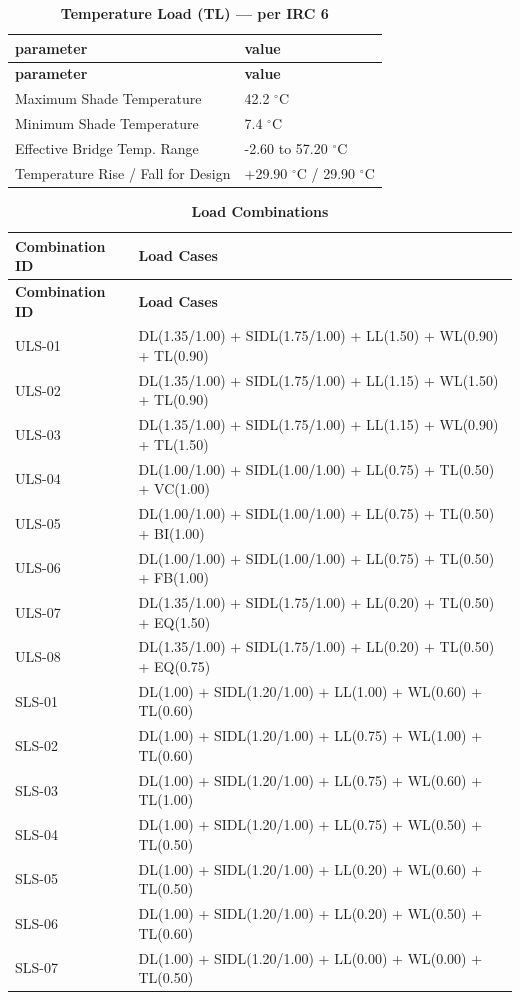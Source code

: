 \documentclass[12pt,a4paper]{report}
\numberwithin{table}{chapter}
\numberwithin{figure}{chapter}
\begin{document}
\vspace{1em}
\begin{longtable}{|L{5.5cm}|p{10.0cm}|}
\caption{\textbf{Temperature Load (TL) --- per IRC 6}}
\hline
\textbf{parameter} & \textbf{value} \\
\hline
\endfirsthead
\hline
\textbf{parameter} & \textbf{value} \\
\hline
\endhead
\textnormal{Maximum Shade Temperature} & 42.2 $^\circ$C \\[6pt]
\hline
\textnormal{Minimum Shade Temperature} & 7.4 $^\circ$C \\[6pt]
\hline
\textnormal{Effective Bridge Temp. Range} & -2.60 to 57.20 $^\circ$C \\[6pt]
\hline
\textnormal{Temperature Rise / Fall for Design} & +29.90 $^\circ$C / \textminus{}29.90 $^\circ$C \\[6pt]
\hline
\end{longtable}
\newpage
\vspace{1em}
\begin{longtable}{|C{4.0cm}|p{11.5cm}|}
\caption{\textbf{Load Combinations}}
\hline
\textbf{Combination ID} & \textbf{Load Cases} \\[6pt]
\hline
\endfirsthead
\hline
\textbf{Combination ID} & \textbf{Load Cases} \\[6pt]
\hline
\endhead
ULS-01 & DL(1.35/1.00) + SIDL(1.75/1.00) + LL(1.50) + WL(0.90) + TL(0.90) \\[6pt]
\hline
ULS-02 & DL(1.35/1.00) + SIDL(1.75/1.00) + LL(1.15) + WL(1.50) + TL(0.90) \\[6pt]
\hline
ULS-03 & DL(1.35/1.00) + SIDL(1.75/1.00) + LL(1.15) + WL(0.90) + TL(1.50) \\[6pt]
\hline
ULS-04 & DL(1.00/1.00) + SIDL(1.00/1.00) + LL(0.75) + TL(0.50) + VC(1.00) \\[6pt]
\hline
ULS-05 & DL(1.00/1.00) + SIDL(1.00/1.00) + LL(0.75) + TL(0.50) + BI(1.00) \\[6pt]
\hline
ULS-06 & DL(1.00/1.00) + SIDL(1.00/1.00) + LL(0.75) + TL(0.50) + FB(1.00) \\[6pt]
\hline
ULS-07 & DL(1.35/1.00) + SIDL(1.75/1.00) + LL(0.20) + TL(0.50) + EQ(1.50) \\[6pt]
\hline
ULS-08 & DL(1.35/1.00) + SIDL(1.75/1.00) + LL(0.20) + TL(0.50) + EQ(0.75) \\[6pt]
\hline
SLS-01 & DL(1.00) + SIDL(1.20/1.00) + LL(1.00) + WL(0.60) + TL(0.60) \\[6pt]
\hline
SLS-02 & DL(1.00) + SIDL(1.20/1.00) + LL(0.75) + WL(1.00) + TL(0.60) \\[6pt]
\hline
SLS-03 & DL(1.00) + SIDL(1.20/1.00) + LL(0.75) + WL(0.60) + TL(1.00) \\[6pt]
\hline
SLS-04 & DL(1.00) + SIDL(1.20/1.00) + LL(0.75) + WL(0.50) + TL(0.50) \\[6pt]
\hline
SLS-05 & DL(1.00) + SIDL(1.20/1.00) + LL(0.20) + WL(0.60) + TL(0.50) \\[6pt]
\hline
SLS-06 & DL(1.00) + SIDL(1.20/1.00) + LL(0.20) + WL(0.50) + TL(0.60) \\[6pt]
\hline
SLS-07 & DL(1.00) + SIDL(1.20/1.00) + LL(0.00) + WL(0.00) + TL(0.50) \\[6pt]
\hline
\end{longtable}
\end{document}
